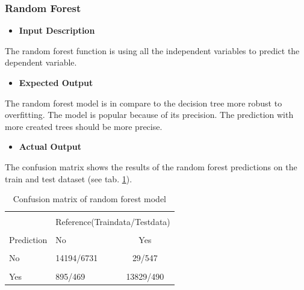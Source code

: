  \subsubsection{Random Forest}
  	\begin{itemize}
  		\item \textbf{Input Description}
  	\end{itemize}
  	\noindent The random forest function is using all the independent variables to predict the dependent variable.
  	\begin{itemize}
  		\item \textbf{Expected Output}
  	\end{itemize}
  	The random forest model is in compare to the decision tree more robust to overfitting. The model is popular because of its precision. The prediction with more created trees should be more precise.\\   
  	\begin{itemize}
  		\item \textbf{Actual Output}
  	\end{itemize}
  	\noindent The confusion matrix shows the results of the random forest predictions on the train and test dataset (see tab. \ref{tab:confmatrix_rf}).
\begin{figure}
\centering
\end{figure}
\begin{center}
  	\begin{table}[!htbp]
  		\centering  
\begin{tabular}{llc}
	\hline
	\hline\\[-1.8ex]
	& \multicolumn{2}{c}{Reference(Traindata/Testdata)} \\
	\cline{2-3}\\[-1.8ex]
	Prediction & No & Yes \\
	\hline \\[-1.8ex] 
	No & 14194/6731 &29/547 \\ 
	\hline \\[-1.8ex] 
	Yes& 895/469 &13829/490 \\ 
	\hline
	\hline
\end{tabular}  
\caption{Confusion matrix of random forest model} 
\label{tab:confmatrix_rf}
\end{table}
\end{center}
  	
